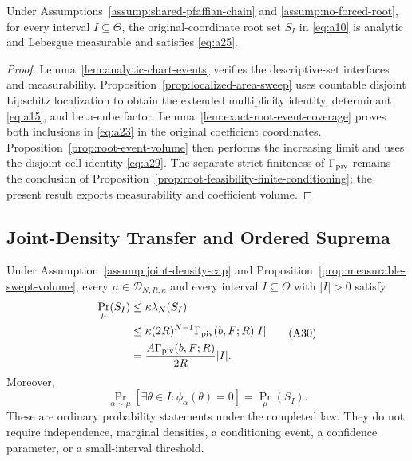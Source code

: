 \begin{proposition}
\label{prop:measurable-swept-volume}
Under Assumptions~\ref{assump:shared-pfaffian-chain} and
\ref{assump:no-forced-root}, for every interval $I\subseteq\Theta$, the
original-coordinate root set $S_I$ in \eqref{eq:a10} is analytic and
Lebesgue measurable and satisfies \eqref{eq:a25}.
\end{proposition}

\begin{proof}
Lemma~\ref{lem:analytic-chart-events} verifies the descriptive-set
interfaces and measurability.  Proposition~\ref{prop:localized-area-sweep}
uses countable disjoint Lipschitz localization to obtain the extended
multiplicity identity, determinant \eqref{eq:a15}, and beta-cube factor.
Lemma~\ref{lem:exact-root-event-coverage} proves both inclusions in
\eqref{eq:a23} in the original coefficient coordinates.
Proposition~\ref{prop:root-event-volume} then performs the increasing limit
and uses the disjoint-cell identity \eqref{eq:a29}.  The separate strict
finiteness of $\Gamma_{\rm piv}$ remains the conclusion of
Proposition~\ref{prop:root-feasibility-finite-conditioning}; the present
result exports measurability and coefficient volume.
\end{proof}

\subsection{Joint-Density Transfer and Ordered Suprema}

\begin{proposition}
\label{prop:joint-density-transfer}
Under Assumption~\ref{assump:joint-density-cap} and
Proposition~\ref{prop:measurable-swept-volume}, every
$\mu\in\mathcal D_{N,R,\kappa}$ and every interval $I\subseteq\Theta$ with
$|I|>0$ satisfy
\[
\begin{aligned}
\Pr_\mu(S_I)
&\leq\kappa\lambda_N(S_I)\\
&\leq\kappa(2R)^{N-1}\Gamma_{\rm piv}(b,F;R)|I|\\
&=\frac{A\Gamma_{\rm piv}(b,F;R)}{2R}|I|.
\end{aligned}
\tag{A30}\label{eq:a30}
\]
Moreover,
\[
\Pr_{\alpha\sim\mu}\!\left[\exists\theta\in I:
\phi_\alpha(\theta)=0\right]=\Pr_\mu(S_I).
\tag{A31}\label{eq:a31}
\]
These are ordinary probability statements under the completed law.  They
do not require independence, marginal densities, a conditioning event, a
confidence parameter, or a small-interval threshold.
\end{proposition}

